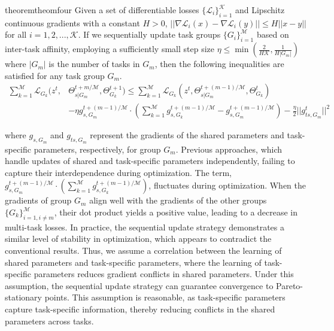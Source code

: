 \begin{restatable}{theorem}{theomfour}
\label{theorem4}
Given a set of differentiable losses $\{\mathcal{L}_i\}_{i=1}^{\mathcal{K}}$ and Lipschitz continuous gradients with a constant $H>0$, $||\nabla \mathcal{L}_i (x) - \nabla \mathcal{L}_i (y)|| \leq H||x-y||$ for all $i=1,2,...,\mathcal{K}$. If we sequentially update task groups $\{G_i\}_{i=1}^{\mathcal{M}}$ based on inter-task affinity, employing a sufficiently small step size $\eta \leq \min(\frac{2}{H\mathcal{K}}, \frac{1}{H|G_m|})$ where $|G_m|$ is the number of tasks in $G_m$, then the following inequalities are satisfied for any task group $G_m$.
\begin{align}
    \sum_{k=1}^{\mathcal{M}} \mathcal{L}_{G_k}(z^t, &\Theta_{s|G_m}^{t+m/\mathcal{M}}, \Theta_{G_k}^{t+1}) 
    \leq \sum_{k=1}^{\mathcal{M}} \mathcal{L}_{G_k}(z^t, \Theta_{s|G_m}^{t+(m-1)/\mathcal{M}}, \Theta_{G_k}^t)\\
    &-\eta g_{s, G_m}^{t+(m-1)/\mathcal{M}} \cdot (\sum_{k=1}^{\mathcal{M}} g_{s, G_k}^{t+(m-1)/\mathcal{M}} - g_{s, G_m}^{t+(m-1)/\mathcal{M}}) - \frac{\eta}{2}||g_{ts, G_m}^t||^2
\end{align}
\end{restatable}
where $g_{s,G_m}$ and $g_{ts,G_m}$ represent the gradients of the shared parameters and task-specific parameters, respectively, for group $G_m$. Previous approaches, which handle updates of shared and task-specific parameters independently, failing to capture their interdependence during optimization.
The term, $g_{s, G_m}^{t+(m-1)/\mathcal{M}} \cdot (\sum_{k=1}^{\mathcal{M}} g_{s, G_k}^{t+(m-1)/\mathcal{M}})$, fluctuates during optimization. When the gradients of group $G_m$ align well with the gradients of the other groups $\{G_k\}_{i=1, i\neq m}^{\mathcal{M}}$, their dot product yields a positive value, leading to a decrease in multi-task losses. In practice, the sequential update strategy demonstrates a similar level of stability in optimization, which appears to contradict the conventional results. Thus, we assume a correlation between the learning of shared parameters and task-specific parameters, where the learning of task-specific parameters reduces gradient conflicts in shared parameters. Under this assumption, the sequential update strategy can guarantee convergence to Pareto-stationary points. This assumption is reasonable, as task-specific parameters capture task-specific information, thereby reducing conflicts in the shared parameters across tasks.

